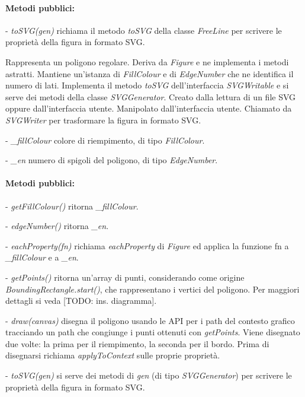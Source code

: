 \paragraph{Metodi pubblici:}
\begin{elencopuntato}[\normindent]
\item[-] \textit{toSVG(gen)} richiama il metodo \textit{toSVG} della classe \textit{FreeLine} per scrivere le propriet\`a della figura in formato SVG.
\end{elencopuntato}


Rappresenta un poligono regolare.
Deriva da \textit{Figure} e ne implementa i metodi astratti. Mantiene un'istanza di \textit{FillColour} e di \textit{EdgeNumber} che ne identifica il numero di lati. Implementa il metodo \textit{toSVG} dell'interfaccia \textit{SVGWritable} e si serve dei metodi della classe \textit{SVGGenerator}.
Creato dalla lettura di un file SVG oppure dall'interfaccia utente. Manipolato dall'interfaccia utente. Chiamato da \textit{SVGWriter} per trasformare la figura in formato SVG.
\begin{elencopuntato}[\normindent]
\item[-] \textit{{\_}fillColour} colore di riempimento, di tipo \textit{FillColour}.
\item[-] \textit{{\_}en} numero di spigoli del poligono, di tipo \textit{EdgeNumber}.
\end{elencopuntato}
\paragraph{Metodi pubblici:}
\begin{elencopuntato}[\normindent]
\item[-] \textit{getFillColour()} ritorna \textit{{\_}fillColour}.
\item[-] \textit{edgeNumber()} ritorna \textit{{\_}en}.
\item[-] \textit{eachProperty(fn)} richiama \textit{eachProperty} di \textit{Figure} ed applica la funzione fn a \textit{{\_}fillColour} e a \textit{{\_en}}.
\item[-] \textit{getPoints()} ritorna un'array di punti, considerando come origine \textit{BoundingRectangle.start()}, che rappresentano i vertici del poligono. Per maggiori dettagli si veda [TODO: ins. diagramma].
\item[-] \textit{draw(canvas)} disegna il poligono usando le API per i path del contesto grafico tracciando  un path che congiunge i punti ottenuti con \textit{getPoints}. Viene disegnato due volte: la prima per il riempimento, la seconda per il bordo. Prima di disegnarsi richiama \textit{applyToContext} sulle proprie propriet\`a.
\item[-] \textit{toSVG(gen)} si serve dei metodi di \textit{gen} (di tipo \textit{SVGGenerator}) per scrivere le propriet\`a della figura in formato SVG.
\end{elencopuntato}

